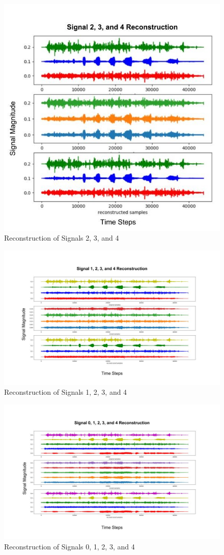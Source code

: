 \documentclass[12pt]{article}
\begin{document}
\begin{figure}[!htb] %
  \centering
  \includegraphics[width =0.7\linewidth]{sig_234.jpg}
  \caption{Reconstruction of Signals 2, 3, and 4}
\end{figure}
\FloatBarrier
\begin{figure}[!htb] %
  \centering
  \includegraphics[width = \linewidth]{sig_1234.jpg}
  \caption{Reconstruction of Signals 1, 2, 3, and 4}
\end{figure}
\FloatBarrier
\begin{figure}[!htb] %
  \centering
  \includegraphics[width = \linewidth]{sig_01234.jpg}
  \caption{Reconstruction of Signals 0, 1, 2, 3, and 4}
\end{figure}
\end{document}
